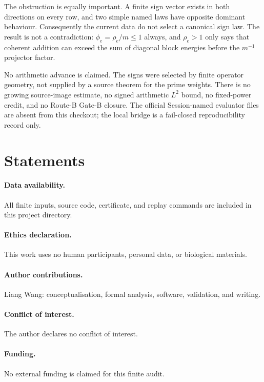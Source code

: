 \documentclass[10pt]{article}
\begin{document}
The obstruction is equally important.  A finite sign vector exists in both
directions on every row, and two simple named laws have opposite dominant
behaviour.  Consequently the current data do not select a canonical sign
law.  The result is not a contradiction: $\phi_e=\rho_e/m\leq1$ always, and
$\rho_e>1$ only says that coherent addition can exceed the sum of diagonal
block energies before the $m^{-1}$ projector factor.

No arithmetic advance is claimed.  The signs were selected by finite
operator geometry, not supplied by a source theorem for the prime weights.
There is no growing source-image estimate, no signed arithmetic $L^2$ bound,
no fixed-power credit, and no Route-B Gate-B closure.  The official
Session-named evaluator files are absent from this checkout; the local
bridge is a fail-closed reproducibility record only.

\section{Statements}

\paragraph{Data availability.} All finite inputs, source code, certificate,
and replay commands are included in this project directory.

\paragraph{Ethics declaration.} This work uses no human participants,
personal data, or biological materials.

\paragraph{Author contributions.} Liang Wang: conceptualisation, formal
analysis, software, validation, and writing.

\paragraph{Conflict of interest.} The author declares no conflict of interest.

\paragraph{Funding.} No external funding is claimed for this finite audit.
\end{document}
